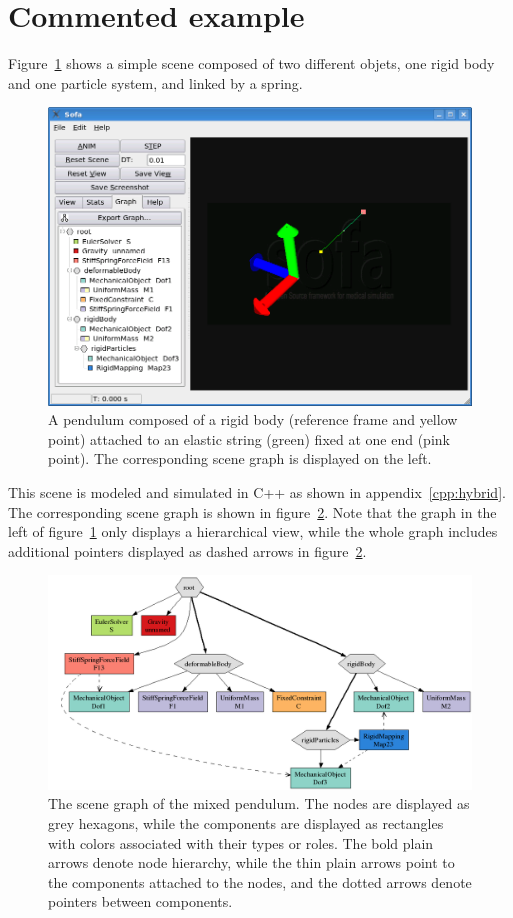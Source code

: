 \section{Commented example} \label{sec:commentedExample}
Figure~\ref{fig:mixedPendulum} shows a simple scene composed of two different objets, one rigid body and one particle system, and linked by a spring.
\begin{figure}
 \centering
 \includegraphics[width=0.9\linewidth]{mixedPendulum.png}
 \caption{A pendulum composed of a rigid body (reference frame and yellow point) attached to an elastic string (green) fixed at one end (pink point). The corresponding scene graph is displayed on the left.}
 \label{fig:mixedPendulum}
\end{figure}
This scene is modeled and simulated in C++ as shown in appendix~\ref{cpp:hybrid}. The corresponding scene graph is shown in figure~\ref{fig:mixedPendulum-graph}. Note that the graph in the left of figure~\ref{fig:mixedPendulum} only displays a hierarchical view, while the whole graph includes additional pointers displayed as dashed arrows in figure~\ref{fig:mixedPendulum-graph}.
\begin{figure}
 \centering
 \includegraphics[width=\linewidth]{mixedPendulum-graph}
 \caption{The scene graph of the mixed pendulum. The nodes are displayed as grey hexagons, while the components are displayed as rectangles with colors associated with their types or roles. The bold plain arrows denote node hierarchy, while the thin plain arrows point to the components attached to the nodes, and the dotted arrows denote pointers between components.}
 \label{fig:mixedPendulum-graph}
\end{figure}

